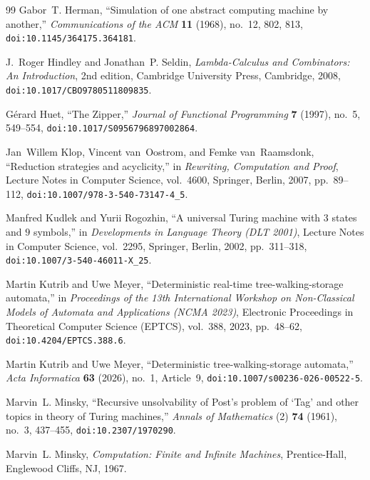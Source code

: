 \documentclass[11pt,reqno]{amsart}
\numberwithin{equation}{section}
\theoremstyle{plain}
\theoremstyle{definition}
\theoremstyle{remark}
\begin{document}
\begin{thebibliography}{99}
Gabor~T. Herman,
``Simulation of one abstract computing machine by another,''
\emph{Communications of the ACM} \textbf{11} (1968), no.~12, 802, 813,
\texttt{doi:10.1145/364175.364181}.

J.~Roger Hindley and Jonathan~P. Seldin,
\emph{Lambda-Calculus and Combinators: An Introduction},
2nd edition, Cambridge University Press, Cambridge, 2008,
\texttt{doi:10.1017/CBO9780511809835}.

G{\'e}rard Huet,
``The Zipper,''
\emph{Journal of Functional Programming} \textbf{7} (1997), no.~5, 549--554,
\texttt{doi:10.1017/S0956796897002864}.

Jan~Willem Klop, Vincent van~Oostrom, and Femke van~Raamsdonk,
``Reduction strategies and acyclicity,''
in \emph{Rewriting, Computation and Proof},
Lecture Notes in Computer Science, vol.~4600, Springer, Berlin, 2007, pp.~89--112,
\texttt{doi:10.1007/978-3-540-73147-4\_5}.

Manfred Kudlek and Yurii Rogozhin,
``A universal Turing machine with $3$ states and $9$ symbols,''
in \emph{Developments in Language Theory (DLT 2001)},
Lecture Notes in Computer Science, vol.~2295, Springer, Berlin, 2002, pp.~311--318,
\texttt{doi:10.1007/3-540-46011-X\_25}.

Martin Kutrib and Uwe Meyer,
``Deterministic real-time tree-walking-storage automata,''
in \emph{Proceedings of the 13th International Workshop on Non-Classical Models of Automata and Applications (NCMA 2023)},
Electronic Proceedings in Theoretical Computer Science (EPTCS), vol.~388, 2023, pp.~48--62,
\texttt{doi:10.4204/EPTCS.388.6}.

Martin Kutrib and Uwe Meyer,
``Deterministic tree-walking-storage automata,''
\emph{Acta Informatica} \textbf{63} (2026), no.~1, Article~9,
\texttt{doi:10.1007/s00236-026-00522-5}.

Marvin~L. Minsky,
``Recursive unsolvability of Post's problem of `Tag' and other topics in theory of Turing machines,''
\emph{Annals of Mathematics} (2) \textbf{74} (1961), no.~3, 437--455,
\texttt{doi:10.2307/1970290}.

Marvin~L. Minsky,
\emph{Computation: Finite and Infinite Machines},
Prentice-Hall, Englewood Cliffs, NJ, 1967.


\end{thebibliography}
\end{document}
